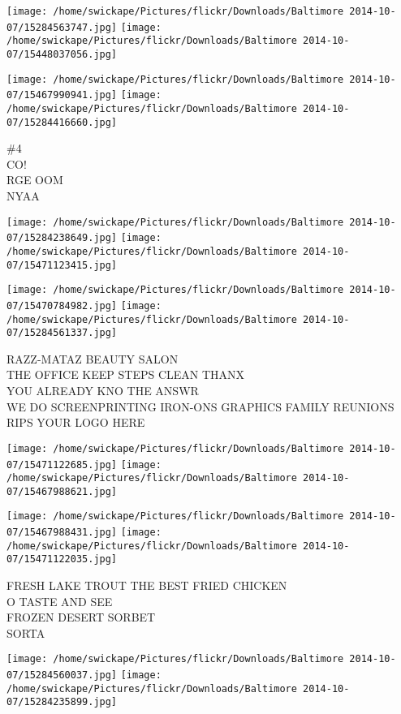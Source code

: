 \documentclass[10pt,letterpaper]{article}
\begin{document}
\texttt{[image: /home/swickape/Pictures/flickr/Downloads/Baltimore 2014-10-07/15284563747.jpg]}
\texttt{[image: /home/swickape/Pictures/flickr/Downloads/Baltimore 2014-10-07/15448037056.jpg]}

\texttt{[image: /home/swickape/Pictures/flickr/Downloads/Baltimore 2014-10-07/15467990941.jpg]}
\texttt{[image: /home/swickape/Pictures/flickr/Downloads/Baltimore 2014-10-07/15284416660.jpg]}

\#4\\
CO!\\
RGE OOM\\
NYAA
\pagebreak

\texttt{[image: /home/swickape/Pictures/flickr/Downloads/Baltimore 2014-10-07/15284238649.jpg]}
\texttt{[image: /home/swickape/Pictures/flickr/Downloads/Baltimore 2014-10-07/15471123415.jpg]}

\texttt{[image: /home/swickape/Pictures/flickr/Downloads/Baltimore 2014-10-07/15470784982.jpg]}
\texttt{[image: /home/swickape/Pictures/flickr/Downloads/Baltimore 2014-10-07/15284561337.jpg]}

RAZZ{-}MATAZ BEAUTY SALON\\
THE OFFICE KEEP STEPS CLEAN THANX\\
YOU ALREADY KNO THE ANSWR\\
WE DO SCREENPRINTING IRON{-}ONS GRAPHICS FAMILY REUNIONS RIPS YOUR LOGO HERE
\pagebreak

\texttt{[image: /home/swickape/Pictures/flickr/Downloads/Baltimore 2014-10-07/15471122685.jpg]}
\texttt{[image: /home/swickape/Pictures/flickr/Downloads/Baltimore 2014-10-07/15467988621.jpg]}

\texttt{[image: /home/swickape/Pictures/flickr/Downloads/Baltimore 2014-10-07/15467988431.jpg]}
\texttt{[image: /home/swickape/Pictures/flickr/Downloads/Baltimore 2014-10-07/15471122035.jpg]}

FRESH LAKE TROUT THE BEST FRIED CHICKEN\\
O TASTE AND SEE\\
FROZEN DESERT SORBET\\
SORTA
\pagebreak

\texttt{[image: /home/swickape/Pictures/flickr/Downloads/Baltimore 2014-10-07/15284560037.jpg]}
\texttt{[image: /home/swickape/Pictures/flickr/Downloads/Baltimore 2014-10-07/15284235899.jpg]}
\end{document}
